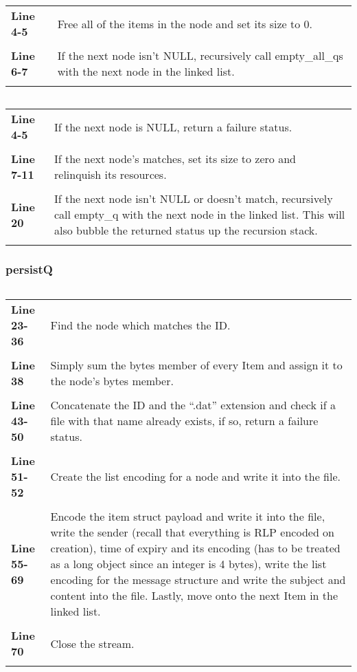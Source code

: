 \documentclass[a4paper, 12pt, titlepage]{article}
\newenvironment{code}{\captionsetup{type=listing}}{}
\newcommand{\sourcecode}[3]{
    \begin{code}
      \inputminted[linenos,numbersep=5pt,gobble=0,frame=lines,framesep=2mm,]{c}{#1}
        \caption{#2}
        \label{lst: #3}
    \end{code}
}
\begin{document}
\begin{onehalfspacing}
   \begin{longtable}{l p{10cm}}
     \textbf{Line 4-5} & Free all of the items in the node and set its size to 0. \\ \\
     \textbf{Line 6-7} & If the next node isn't NULL, recursively call empty\_all\_qs with the next node in the linked list. \\ \\
   \end{longtable}

   \sourcecode{snippets/task2b/empty_q.c}{empty\_q helper function}{empty_q}

   \begin{longtable}{l p{10cm}}
     \textbf{Line 4-5} & If the next node is NULL, return a failure status. \\ \\
     \textbf{Line 7-11} & If the next node's matches, set its size to zero and relinquish its resources. \\ \\
     \textbf{Line 20} & If the next node isn't NULL or doesn't match, recursively call empty\_q with the next node in the linked list. This will also bubble the returned status up the recursion stack. \\ \\
   \end{longtable}

   \subsubsection{persistQ}
   \sourcecode{snippets/task2b/persistQs.c}{persistQs method implementation}{task2b_persistQs}
      \begin{longtable}{l p{10cm}}
     \textbf{Line 23-36} & Find the node which matches the ID. \\ \\
     \textbf{Line 38} & Simply sum the bytes member of every Item and assign it to the node's bytes member. \\ \\
     \textbf{Line 43-50} & Concatenate the ID and the ``.dat'' extension and check if a file with that name already exists, if so, return a failure status. \\ \\
     \textbf{Line 51-52} & Create the list encoding for a node and write it into the file. \\ \\
     \textbf{Line 55-69} & Encode the item struct payload and write it into the file, write the sender (recall that everything is RLP encoded on creation), time of expiry and its encoding (has to be treated as a long object since an integer is 4 bytes), write the list encoding for the message structure and write the subject and content into the file. Lastly, move onto the next Item in the linked list. \\ \\
     \textbf{Line 70} & Close the stream. \\ \\
   \end{longtable}


\end{onehalfspacing}
\end{document}
